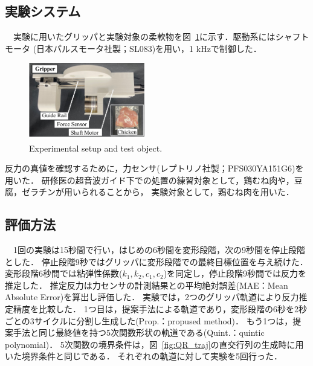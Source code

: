 \documentclass[a4paper]{jarticle}
\begin{document}
\subsection{実験システム}
　実験に用いたグリッパと実験対象の柔軟物を図~\ref{fig:exp_setup}に示す．駆動系にはシャフトモータ (日本パルスモータ社製；SL083)を用い，1 kHzで制御した．
\begin{figure}[tb]
    \centering
    \includegraphics[width=0.45\textwidth]{exp_setup_chicken.pdf}
    \caption{Experimental setup and test object.}
    \label{fig:exp_setup}
\end{figure}
反力の真値を確認するために，力センサ(レプトリノ社製；PFS030YA151G6)を用いた．
研修医の超音波ガイド下での処置の練習対象として，鶏むね肉や，豆腐，ゼラチンが用いられることから\cite{exp_ref1}\cite{exp_ref3}，
実験対象として，鶏むね肉を用いた．
\subsection{評価方法}
　1回の実験は15秒間で行い，はじめの6秒間を変形段階，次の9秒間を停止段階とした．
停止段階9秒ではグリッパに変形段階での最終目標位置を与え続けた．
変形段階6秒間では粘弾性係数($k_1, k_2, c_1, c_2$)を同定し，停止段階9秒間では反力を推定した．
推定反力は力センサの計測結果との平均絶対誤差(MAE：Mean Absolute Error)を算出し評価した．
実験では，2つのグリッパ軌道により反力推定精度を比較した．
1つ目は，提案手法による軌道であり，変形段階の6秒を2秒ごとの3サイクルに分割し生成した(Prop.：propused method)．
もう1つは，提案手法と同じ最終値を持つ5次関数形状の軌道である(Quint.：quintic polynomial)．
5次関数の境界条件は，図~{\ref{fig:QR_traj}}の直交行列の生成時に用いた境界条件と同じである．
{\color{blue}
それぞれの軌道に対して実験を5回行った．
}
\end{document}
